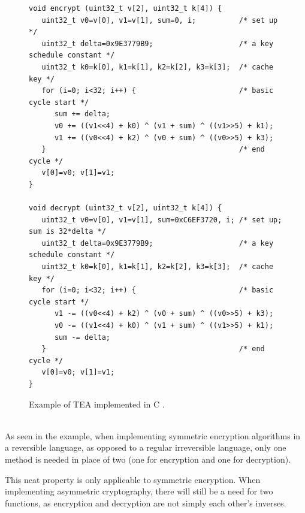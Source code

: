 \begin{figure}[!h]\small
\begin{verbatim}
void encrypt (uint32_t v[2], uint32_t k[4]) {
   uint32_t v0=v[0], v1=v[1], sum=0, i;          /* set up */
   uint32_t delta=0x9E3779B9;                    /* a key schedule constant */
   uint32_t k0=k[0], k1=k[1], k2=k[2], k3=k[3];  /* cache key */
   for (i=0; i<32; i++) {                        /* basic cycle start */
      sum += delta;
      v0 += ((v1<<4) + k0) ^ (v1 + sum) ^ ((v1>>5) + k1);
      v1 += ((v0<<4) + k2) ^ (v0 + sum) ^ ((v0>>5) + k3);
   }                                             /* end cycle */
   v[0]=v0; v[1]=v1;
}

void decrypt (uint32_t v[2], uint32_t k[4]) {
   uint32_t v0=v[0], v1=v[1], sum=0xC6EF3720, i; /* set up; sum is 32*delta */
   uint32_t delta=0x9E3779B9;                    /* a key schedule constant */
   uint32_t k0=k[0], k1=k[1], k2=k[2], k3=k[3];  /* cache key */
   for (i=0; i<32; i++) {                        /* basic cycle start */
      v1 -= ((v0<<4) + k2) ^ (v0 + sum) ^ ((v0>>5) + k3);
      v0 -= ((v1<<4) + k0) ^ (v1 + sum) ^ ((v1>>5) + k1);
      sum -= delta;
   }                                             /* end cycle */
   v[0]=v0; v[1]=v1;
}
\end{verbatim} 
\caption{Example of TEA implemented in C \cite{PSI19}.}
\end{figure}
\\
As seen in the example, when implementing symmetric encryption algorithms in a reversible language, as opposed to a regular irreversible language, only one method is needed in place of two (one for encryption and one for decryption).

This neat property is only applicable to symmetric encryption. When implementing asymmetric cryptography, there will still be a need for two functions, as encryption and decryption are not simply each other's inverses.
